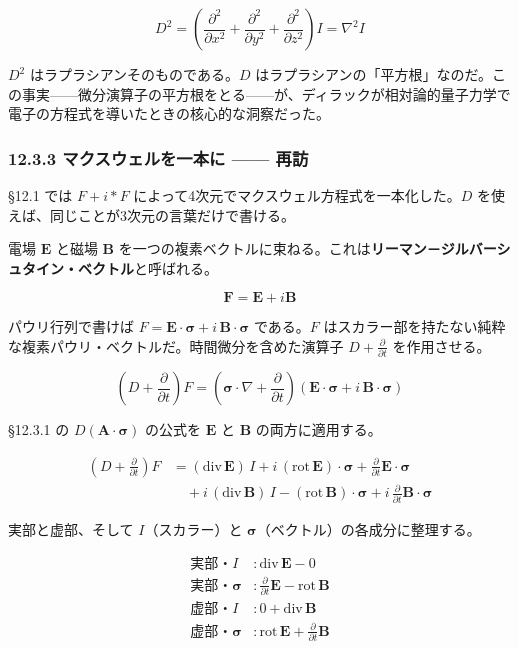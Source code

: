 \documentclass[a4paper,12pt,openany]{book}
\begin{document}
\[D^2 = \left(\frac{\partial^2}{\partial x^2} + \frac{\partial^2}{\partial y^2} + \frac{\partial^2}{\partial z^2}\right)I = \nabla^2 I\]

\(D^2\) はラプラシアンそのものである。\(D\)
はラプラシアンの「平方根」なのだ。この事実——微分演算子の平方根をとる——が、ディラックが相対論的量子力学で電子の方程式を導いたときの核心的な洞察だった。

\hypertarget{ux30deux30afux30b9ux30a6ux30a7ux30ebux3092ux4e00ux672cux306b-ux518dux8a2a}{%
\subsubsection{12.3.3 マクスウェルを一本に ——
再訪}\label{ux30deux30afux30b9ux30a6ux30a7ux30ebux3092ux4e00ux672cux306b-ux518dux8a2a}}

§12.1 では \(F + i\ast F\)
によって4次元でマクスウェル方程式を一本化した。\(D\)
を使えば、同じことが3次元の言葉だけで書ける。

電場 \(\mathbf{E}\) と磁場 \(\mathbf{B}\)
を一つの複素ベクトルに束ねる。これは\textbf{リーマン－ジルバーシュタイン・ベクトル}と呼ばれる。

\[\mathbf{F} = \mathbf{E} + i\mathbf{B}\]

パウリ行列で書けば
\(F = \mathbf{E}\!\cdot\!\bm{\sigma} + i\,\mathbf{B}\!\cdot\!\bm{\sigma}\)
である。\(F\)
はスカラー部を持たない純粋な複素パウリ・ベクトルだ。時間微分を含めた演算子
\(D + \frac{\partial}{\partial t}\) を作用させる。

\[(D + \frac{\partial}{\partial t})F = (\bm{\sigma}\!\cdot\!\nabla + \frac{\partial}{\partial t})(\mathbf{E}\!\cdot\!\bm{\sigma} + i\,\mathbf{B}\!\cdot\!\bm{\sigma})\]

§12.3.1 の \(D(\mathbf{A}\!\cdot\!\bm{\sigma})\) の公式を \(\mathbf{E}\)
と \(\mathbf{B}\) の両方に適用する。

\[
\begin{aligned}
(D + \frac{\partial}{\partial t})F &= (\mathrm{div}\,\mathbf{E})\,I + i\,(\mathrm{rot}\,\mathbf{E})\!\cdot\!\bm{\sigma} + \frac{\partial}{\partial t}\mathbf{E}\!\cdot\!\bm{\sigma} \\
&\quad + i\,(\mathrm{div}\,\mathbf{B})\,I - (\mathrm{rot}\,\mathbf{B})\!\cdot\!\bm{\sigma} + i\,\frac{\partial}{\partial t}\mathbf{B}\!\cdot\!\bm{\sigma}
\end{aligned}
\]

実部と虚部、そして \(I\)（スカラー）と
\(\bm{\sigma}\)（ベクトル）の各成分に整理する。

\[
\begin{aligned}
\text{実部・}I &: \mathrm{div}\,\mathbf{E} - 0 \\
\text{実部・}\bm{\sigma} &: \frac{\partial}{\partial t}\mathbf{E} - \mathrm{rot}\,\mathbf{B} \\
\text{虚部・}I &: 0 + \mathrm{div}\,\mathbf{B} \\
\text{虚部・}\bm{\sigma} &: \mathrm{rot}\,\mathbf{E} + \frac{\partial}{\partial t}\mathbf{B}
\end{aligned}
\]
\end{document}
